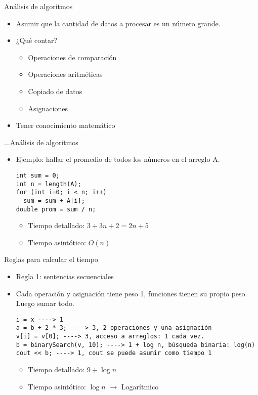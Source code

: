 \documentclass[aspectratio=169]{beamer}
\begin{document}
\begin{frame}{Análisis de algoritmos}
  \begin{itemize}
    \item Asumir que la cantidad de datos a procesar es un número grande.
    \item ¿Qué contar?
    \begin{itemize}
      \item Operaciones de comparación
      \item Operaciones aritméticas
      \item Copiado de datos
      \item Asignaciones
    \end{itemize}
    \item Tener conocimiento matemático
  \end{itemize}
\end{frame}

\begin{frame}[fragile]{...Análisis de algoritmos}
  \begin{itemize}
    \item Ejemplo: hallar el promedio de todos los números en el arreglo A.
	\begin{lstlisting}
int sum = 0;
int n = length(A);
for (int i=0; i < n; i++)
  sum = sum + A[i];
double prom = sum / n;
    \end{lstlisting}
    \begin{itemize}
      \item Tiempo detallado: $3 + 3n + 2 = 2n + 5$
      \item Tiempo asintótico: $O(n)$
    \end{itemize}
  \end{itemize}
\end{frame}

\begin{frame}[fragile]{Reglas para calcular el tiempo}
  \begin{itemize}
    \item Regla 1: sentencias secuenciales
    \item Cada operación y asignación tiene peso 1, funciones tienen su propio peso. Luego sumar todo.
    \begin{lstlisting}
i = x ----> 1
a = b + 2 * 3; ----> 3, 2 operaciones y una asignación
v[i] = v[0]; ----> 3, acceso a arreglos: 1 cada vez.
b = binarySearch(v, 10); ----> 1 + log n, búsqueda binaria: log(n)
cout << b; ----> 1, cout se puede asumir como tiempo 1
    \end{lstlisting}
    \begin{itemize}
      \item Tiempo detallado: $9 + \log n$
      \item Tiempo asintótico: $\log n$ $\longrightarrow$ Logarítmico
    \end{itemize}
  \end{itemize}
\end{frame}
\end{document}
